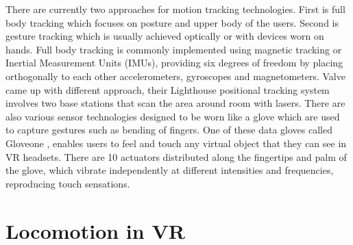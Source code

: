 There are currently two approaches for motion tracking technologies. First is full body tracking which focuses on posture and upper body of the users. Second is gesture tracking which is usually achieved optically or with devices worn on hands. Full body tracking is commonly implemented using magnetic tracking or Inertial Measurement Units (IMUs), providing six degrees of freedom by placing orthogonally to each other accelerometers, gyroscopes and magnetometers. Valve came up with different approach, their Lighthouse positional tracking system involves two base stations \cite{VIVE_STATION} that scan the area around room with lasers. There are also various sensor technologies designed to be worn like a glove which are used to capture gestures such as bending of fingers. One of these data gloves called Gloveone \cite{GLOVEONE}, enables users to feel and touch any virtual object that they can see in VR headsets. There are 10 actuators distributed along the fingertips and palm of the glove, which vibrate independently at different intensities and frequencies, reproducing touch sensations.

\section{Locomotion in VR}




